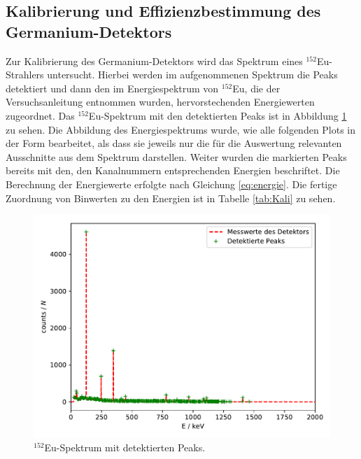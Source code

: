 \subsection{Kalibrierung und Effizienzbestimmung des Germanium-Detektors}

Zur Kalibrierung des Germanium-Detektors wird das Spektrum eines $^{152}$Eu-Strahlers untersucht. Hierbei
werden im aufgenommenen Spektrum die Peaks detektiert und dann den im Energiespektrum von $^{152}$Eu, die der
Versuchsanleitung \cite{Q1} entnommen wurden, hervorstechenden Energiewerten zugeordnet. Das
$^{152}$Eu-Spektrum mit den detektierten Peaks ist in
Abbildung \ref{abb:Europiumspektrum} zu sehen. Die Abbildung des
Energiespektrums wurde, wie alle folgenden Plots in der Form bearbeitet, als
dass sie jeweils nur die für die Auswertung relevanten Ausschnitte aus dem
Spektrum darstellen. Weiter wurden die markierten Peaks bereits mit den, den
Kanalnummern entsprechenden Energien beschriftet. Die Berechnung der
Energiewerte erfolgte nach Gleichung \ref{eq:energie}.
Die fertige Zuordnung von Binwerten zu den Energien ist in Tabelle
\ref{tab:Kali} zu sehen.
\FloatBarrier
\begin{figure}
    \centering
    \includegraphics[scale=0.7]{Detektormesswerte.pdf}
    \caption{$^{152}$Eu-Spektrum mit detektierten Peaks.}
    \label{abb:Europiumspektrum}
\end{figure}
\FloatBarrier

